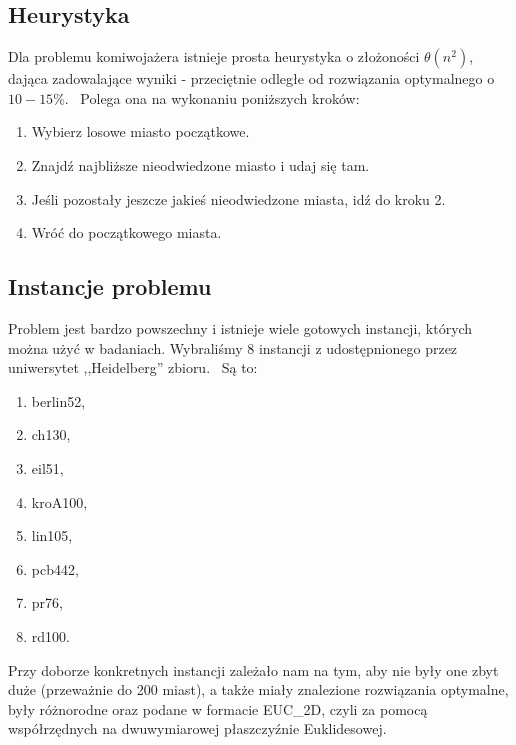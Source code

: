 \subsection{Heurystyka}

Dla problemu komiwojażera istnieje prosta heurystyka o złożoności $\theta(n^2)$, dająca zadowalające wyniki - przeciętnie odległe od rozwiązania optymalnego o~$10-15\%$.~\cite{Heuristic} Polega ona na wykonaniu poniższych kroków:

\begin{enumerate}
    \item Wybierz losowe miasto początkowe.
    \item Znajdź najbliższe nieodwiedzone miasto i udaj się tam.
    \item Jeśli pozostały jeszcze jakieś nieodwiedzone miasta, idź do kroku 2.
    \item Wróć do początkowego miasta.
\end{enumerate}

\subsection{Instancje problemu}

Problem jest bardzo powszechny i istnieje wiele gotowych instancji, których można użyć w badaniach. Wybraliśmy 8 instancji z udostępnionego przez uniwersytet ,,Heidelberg'' zbioru.~\cite{instances} Są to:

\begin{enumerate}
    \item berlin52,
    \item ch130,
    \item eil51,
    \item kroA100,
    \item lin105,
    \item pcb442,
    \item pr76,
    \item rd100.
\end{enumerate}

Przy doborze konkretnych instancji zależało nam na tym, aby nie były one zbyt duże (przeważnie do 200 miast), a także miały znalezione rozwiązania optymalne, były różnorodne oraz podane w formacie EUC_2D, czyli za pomocą współrzędnych na dwuwymiarowej płaszczyźnie Euklidesowej.